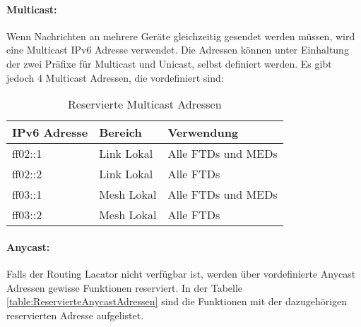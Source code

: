 \paragraph{Multicast:}\label{par:ThreadMulticast}
Wenn Nachrichten an mehrere Geräte gleichzeitig gesendet werden müssen, wird eine Multicast IPv6 Adresse verwendet. Die Adressen können unter Einhaltung der zwei Präfixe für Multicast und Unicast, selbst definiert werden. Es gibt jedoch 4 Multicast Adressen, die vordefiniert sind:

\begin{table}[H]
	\centering
	\begin{tabular}{|l|l|l|}
		\hline
		\textbf{IPv6 Adresse} & \textbf{Bereich} & \textbf{Verwendung} \\ \hline
		ff02::1               & Link Lokal       & Alle FTDs und MEDs  \\ \hline
		ff02::2               & Link Lokal       & Alle FTDs           \\ \hline
		ff03::1               & Mesh Lokal       & Alle FTDs und MEDs  \\ \hline
		ff03::2               & Mesh Lokal       & Alle FTDs           \\ \hline
	\end{tabular}
	\caption{Reservierte Multicast Adressen}
	\label{table:ReservierteMulticastAdressen}
\end{table}

\paragraph{Anycast:}
Falls der Routing Lacator nicht verfügbar ist, werden über vordefinierte Anycast Adressen gewisse Funktionen reserviert. In der Tabelle \ref{table:ReservierteAnycastAdressen} sind die Funktionen mit der dazugehörigen reservierten Adresse aufgelistet.


